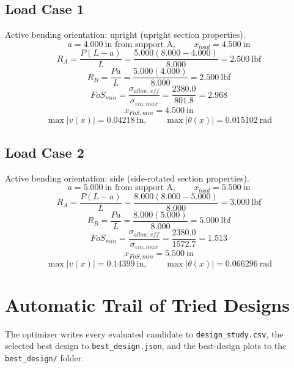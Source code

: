 \documentclass[11pt]{article}
\begin{document}
\subsection*{Load Case 1}
Active bending orientation: upright (upright section properties).
\[a = 4.000\ \mathrm{in} \text{ from support A}, \qquad x_{load} = 4.500\ \mathrm{in}\]
\[R_A = \frac{P(L-a)}{L} = \frac{5.000(8.000-4.000)}{8.000} = 2.500\ \mathrm{lbf}\]
\[R_B = \frac{Pa}{L} = \frac{5.000(4.000)}{8.000} = 2.500\ \mathrm{lbf}\]
\[FoS_{min} = \frac{\sigma_{allow,eff}}{\sigma_{vm,max}} = \frac{2380.0}{801.8} = 2.968\]
\[x_{FoS,min} = 4.500\ \mathrm{in}\]
\[\max |v(x)| = 0.04218\ \mathrm{in}, \qquad \max |\theta(x)| = 0.015102\ \mathrm{rad}\]
\subsection*{Load Case 2}
Active bending orientation: side (side-rotated section properties).
\[a = 5.000\ \mathrm{in} \text{ from support A}, \qquad x_{load} = 5.500\ \mathrm{in}\]
\[R_A = \frac{P(L-a)}{L} = \frac{8.000(8.000-5.000)}{8.000} = 3.000\ \mathrm{lbf}\]
\[R_B = \frac{Pa}{L} = \frac{8.000(5.000)}{8.000} = 5.000\ \mathrm{lbf}\]
\[FoS_{min} = \frac{\sigma_{allow,eff}}{\sigma_{vm,max}} = \frac{2380.0}{1572.7} = 1.513\]
\[x_{FoS,min} = 5.500\ \mathrm{in}\]
\[\max |v(x)| = 0.14399\ \mathrm{in}, \qquad \max |\theta(x)| = 0.066296\ \mathrm{rad}\]

\section*{Automatic Trail of Tried Designs}
The optimizer writes every evaluated candidate to \texttt{design\_study.csv}, the selected best design to \texttt{best\_design.json}, and the best-design plots to the \texttt{best\_design/} folder.
\end{document}
